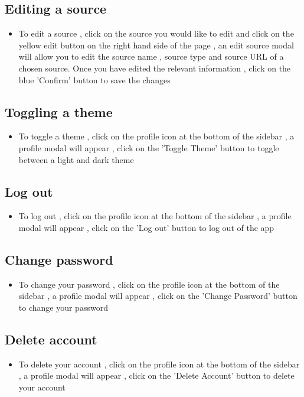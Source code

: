 \documentclass[12pt]{article}
\begin{document}
\subsection{Editing a source}
\begin{itemize}
    \item To edit a source , click on the source you would like to edit and click on the yellow edit button on the right hand side of the page , an edit source modal will allow you to edit the source name , source type and source URL of a chosen source. Once you have edited the relevant information , click on the blue 'Confirm' button to save the changes
\end{itemize}
\subsection{Toggling a theme}
\begin{itemize}
    \item To toggle a theme , click on the profile icon at the bottom of the sidebar , a profile modal will appear , click on the 'Toggle Theme' button to toggle between a light and dark theme
\end{itemize}
\subsection{Log out}
\begin{itemize}
    \item To log out , click on the profile icon at the bottom of the sidebar , a profile modal will appear , click on the 'Log out' button to log out of the app
\end{itemize}
\subsection{Change password}
\begin{itemize}
    \item To change your password , click on the profile icon at the bottom of the sidebar , a profile modal will appear , click on the 'Change Password' button to change your password
\end{itemize}
\subsection{Delete account}
\begin{itemize}
    \item To delete your account , click on the profile icon at the bottom of the sidebar , a profile modal will appear , click on the 'Delete Account' button to delete your account
\end{itemize}
\newpage
\end{document}
